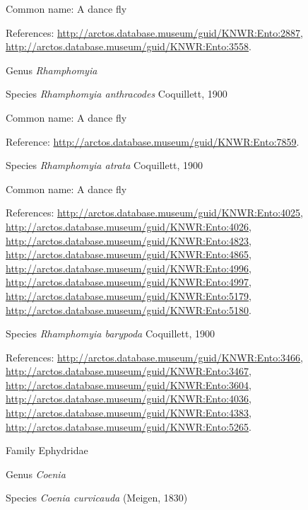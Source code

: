 \documentclass[9pt, article]{memoir}
\begin{document}
\begin{multicols}{2}
Common name: A dance fly

References: 
\url{http://arctos.database.museum/guid/KNWR:Ento:2887}, 
\url{http://arctos.database.museum/guid/KNWR:Ento:3558}.

\vspace{6pt}\noindent\hspace{30pt}Genus \textit{Rhamphomyia}


\vspace{6pt}\noindent\hspace{36pt}Species \textit{Rhamphomyia anthracodes} Coquillett, 1900


Common name: A dance fly

Reference: 
\url{http://arctos.database.museum/guid/KNWR:Ento:7859}.

\vspace{6pt}\noindent\hspace{36pt}Species \textit{Rhamphomyia atrata} Coquillett, 1900


Common name: A dance fly

References: 
\url{http://arctos.database.museum/guid/KNWR:Ento:4025}, 
\url{http://arctos.database.museum/guid/KNWR:Ento:4026}, 
\url{http://arctos.database.museum/guid/KNWR:Ento:4823}, 
\url{http://arctos.database.museum/guid/KNWR:Ento:4865}, 
\url{http://arctos.database.museum/guid/KNWR:Ento:4996}, 
\url{http://arctos.database.museum/guid/KNWR:Ento:4997}, 
\url{http://arctos.database.museum/guid/KNWR:Ento:5179}, 
\url{http://arctos.database.museum/guid/KNWR:Ento:5180}.

\vspace{6pt}\noindent\hspace{36pt}Species \textit{Rhamphomyia barypoda} Coquillett, 1900


References: 
\url{http://arctos.database.museum/guid/KNWR:Ento:3466}, 
\url{http://arctos.database.museum/guid/KNWR:Ento:3467}, 
\url{http://arctos.database.museum/guid/KNWR:Ento:3604}, 
\url{http://arctos.database.museum/guid/KNWR:Ento:4036}, 
\url{http://arctos.database.museum/guid/KNWR:Ento:4383}, 
\url{http://arctos.database.museum/guid/KNWR:Ento:5265}.

\vspace{6pt}\noindent\hspace{24pt}Family Ephydridae


\vspace{6pt}\noindent\hspace{30pt}Genus \textit{Coenia}


\vspace{6pt}\noindent\hspace{36pt}Species \textit{Coenia curvicauda} (Meigen, 1830)



\end{multicols}
\end{document}
